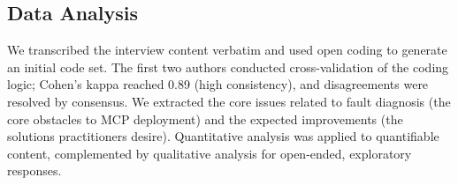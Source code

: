 \subsection{Data Analysis}

We transcribed the interview content verbatim and used open coding \cite{ma2025practitioners}
to generate an initial code set. The first two authors conducted cross-validation of the
coding logic; Cohen's kappa reached 0.89 (high consistency), and disagreements were resolved
by consensus. We extracted the core issues related to fault diagnosis (the core obstacles to
MCP deployment) and the expected improvements (the solutions practitioners desire).
Quantitative analysis \cite{nevin1984quantitative}
was applied to quantifiable content, complemented by qualitative analysis for open-ended,
exploratory responses.